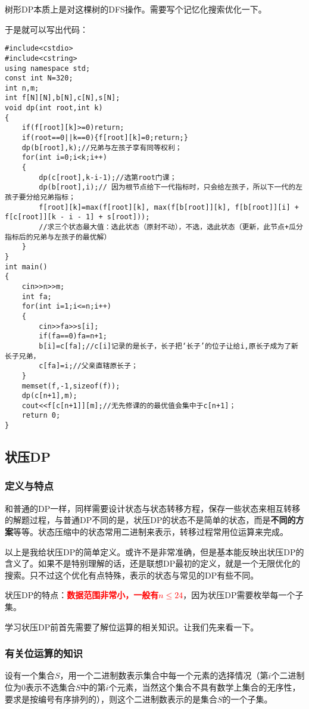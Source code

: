 树形DP本质上是对这棵树的DFS操作。需要写个记忆化搜索优化一下。

于是就可以写出代码：

\begin{verbatim}
#include<cstdio>
#include<cstring>
using namespace std;
const int N=320;
int n,m;
int f[N][N],b[N],c[N],s[N];
void dp(int root,int k)
{
    if(f[root][k]>=0)return;
    if(root==0||k==0){f[root][k]=0;return;}
    dp(b[root],k);//兄弟与左孩子享有同等权利；
    for(int i=0;i<k;i++)
    {
        dp(c[root],k-i-1);//选第root门课； 
        dp(b[root],i);// 因为根节点给下一代指标时，只会给左孩子，所以下一代的左孩子要分给兄弟指标；
        f[root][k]=max(f[root][k], max(f[b[root]][k], f[b[root]][i] + f[c[root]][k - i - 1] + s[root]));
        //求三个状态最大值：选此状态（原封不动），不选，选此状态（更新，此节点+瓜分指标后的兄弟与左孩子的最优解） 
    }
}
int main()
{
    cin>>n>>m;
    int fa;
    for(int i=1;i<=n;i++)
    {
        cin>>fa>>s[i];
        if(fa==0)fa=n+1; 
        b[i]=c[fa];//c[i]记录的是长子，长子把‘长子’的位子让给i,原长子成为了新长子兄弟， 
        c[fa]=i;//父亲直辖原长子； 
    }
    memset(f,-1,sizeof(f));
    dp(c[n+1],m);
    cout<<f[c[n+1]][m];//无先修课的的最优值会集中于c[n+1]； 
    return 0;
}
\end{verbatim}

\note
\subsection{状压DP}
\subsubsection{定义与特点}
\begin{definition}[状压DP]和普通的DP一样，同样需要设计状态与状态转移方程，保存一些状态来相互转移的解题过程，与普通DP不同的是，状压DP的状态不是简单的状态，而是\textbf{不同的方案}等等。状态压缩中的状态常用二进制来表示，转移过程常用位运算来完成。
\end{definition}

以上是我给状压DP的简单定义。或许不是非常准确，但是基本能反映出状压DP的含义了。如果不是特别理解的话，还是联想DP最初的定义，就是一个无限优化的搜索。只不过这个优化有点特殊，表示的状态与常见的DP有些不同。

状压DP的特点：\textcolor{red}{\textbf{数据范围非常小，一般有$n\leq 24$}}，因为状压DP需要枚举每一个子集。

学习状压DP前首先需要了解位运算的相关知识。让我们先来看一下。
\subsubsection{有关位运算的知识}
设有一个集合$S$，用一个二进制数表示集合中每一个元素的选择情况（第$i$个二进制位为0表示不选集合$S$中的第$i$个元素，当然这个集合不具有数学上集合的无序性，要求是按编号有序排列的），则这个二进制数表示的是集合$S$的一个子集。

